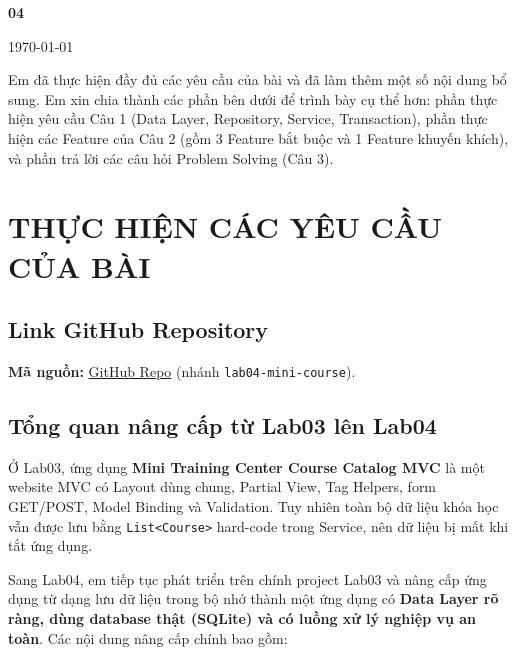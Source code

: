 \thispagestyle{plain}
{\centering
    \vspace*{0.1cm}
    {\Huge \textbf{\color{teal} \coursenamecl} \par}
    {\huge \textbf{{\exercise} 04} \par}
    \vspace{0.4cm}
    {\LARGE \textcolor{ForestGreen}{\studentname} \par}
    \vspace{0.3cm}
    {\LARGE \today \par}
    \vspace{0.8cm}
}

Em đã thực hiện đầy đủ các yêu cầu của bài và đã làm thêm một số nội dung bổ sung. Em xin chia thành các phần bên dưới để trình bày cụ thể hơn: phần thực hiện yêu cầu Câu 1 (Data Layer, Repository, Service, Transaction), phần thực hiện các Feature của Câu 2 (gồm 3 Feature bắt buộc và 1 Feature khuyến khích), và phần trả lời các câu hỏi Problem Solving (Câu 3).

\section{THỰC HIỆN CÁC YÊU CẦU CỦA BÀI}

\subsection{Link GitHub Repository}

\textbf{Mã nguồn:} \href{https://github.com/qanh-khtn/mini-course-catalog-mvc}{GitHub Repo} (nhánh \texttt{lab04-mini-course}).

\subsection{Tổng quan nâng cấp từ Lab03 lên Lab04}

Ở Lab03, ứng dụng \textbf{Mini Training Center Course Catalog MVC} là một website MVC có Layout dùng chung, Partial View, Tag Helpers, form GET/POST, Model Binding và Validation. Tuy nhiên toàn bộ dữ liệu khóa học vẫn được lưu bằng \texttt{List<Course>} hard-code trong Service, nên dữ liệu bị mất khi tắt ứng dụng.

Sang Lab04, em tiếp tục phát triển trên chính project Lab03 và nâng cấp ứng dụng từ dạng lưu dữ liệu trong bộ nhớ thành một ứng dụng có \textbf{Data Layer rõ ràng, dùng database thật (SQLite) và có luồng xử lý nghiệp vụ an toàn}. Các nội dung nâng cấp chính bao gồm:

